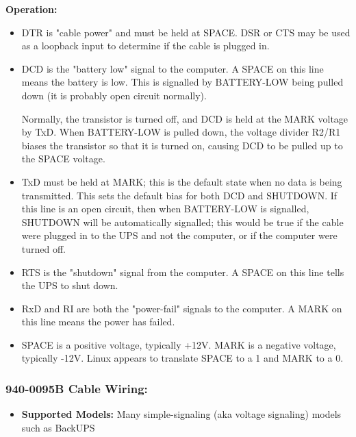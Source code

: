 {\bf Operation:}
\begin{itemize}
\item DTR is "cable power" and must be held at SPACE.  DSR or CTS may be
      used as a loopback input to determine if the cable is plugged in.
\item DCD is the "battery low" signal to the computer.  A SPACE on this
      line means the battery is low.  This is signalled by BATTERY-LOW
      being pulled down (it is probably open circuit normally).
     
     Normally, the transistor is turned off, and DCD is held at the MARK
     voltage by TxD.  When BATTERY-LOW is pulled down, the voltage
     divider R2/R1 biases the transistor so that it is turned on, causing
     DCD to be pulled up to the SPACE voltage.
     
\item TxD must be held at MARK; this is the default state when no data is
     being transmitted.  This sets the default bias for both DCD and
     SHUTDOWN.  If this line is an open circuit, then when BATTERY-LOW is
     signalled, SHUTDOWN will be automatically signalled; this would be
     true if the cable were plugged in to the UPS and not the computer,
     or if the computer were turned off.
     
\item RTS is the "shutdown" signal from the computer.  A SPACE on this
     line tells the UPS to shut down.
     
\item RxD and RI are both the "power-fail" signals to the computer.  A
     MARK on this line means the power has failed.
     
\item SPACE is a positive voltage, typically +12V.  MARK is a negative
     voltage, typically -12V.  Linux appears to translate SPACE to a 1
     and MARK to a 0.
\end{itemize}

\subsubsection*{940-0095B Cable Wiring:}

\begin{itemize}
\item {\bf Supported Models:} Many simple-signaling (aka voltage signaling)
models such as BackUPS
\end{itemize}

